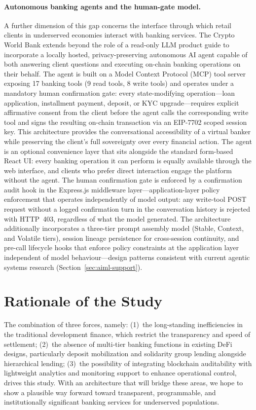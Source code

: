 \documentclass[12pt,a4paper]{report}
\begin{document}
\paragraph{Autonomous banking agents and the human-gate model.}
A further dimension of this gap concerns the interface through which retail clients in underserved economies interact with banking services. The Crypto World Bank extends beyond the role of a read-only LLM product guide to incorporate a locally hosted, privacy-preserving autonomous AI agent capable of both answering client questions and executing on-chain banking operations on their behalf. The agent is built on a Model Context Protocol (MCP) tool server exposing 17 banking tools (9 read tools, 8 write tools) and operates under a mandatory human confirmation gate: every state-modifying operation---loan application, installment payment, deposit, or KYC upgrade---requires explicit affirmative consent from the client before the agent calls the corresponding write tool and signs the resulting on-chain transaction via an EIP-7702 scoped session key. This architecture provides the conversational accessibility of a virtual banker while preserving the client's full sovereignty over every financial action. The agent is an optional convenience layer that sits alongside the standard form-based React UI: every banking operation it can perform is equally available through the web interface, and clients who prefer direct interaction engage the platform without the agent. The human confirmation gate is enforced by a confirmation audit hook in the Express.js middleware layer---application-layer policy enforcement that operates independently of model output: any write-tool POST request without a logged confirmation turn in the conversation history is rejected with HTTP~403, regardless of what the model generated. The architecture additionally incorporates a three-tier prompt assembly model (Stable, Context, and Volatile tiers), session lineage persistence for cross-session continuity, and pre-call lifecycle hooks that enforce policy constraints at the application layer independent of model behaviour---design patterns consistent with current agentic systems research (Section~\ref{sec:aiml-support}).

\section{Rationale of the Study}

The combination of three forces, namely: (1)~the long-standing inefficiencies in the traditional development finance, which restrict the transparency and speed of settlement; (2)~the absence of multi-tier banking functions in existing DeFi designs, particularly deposit mobilization and solidarity group lending alongside hierarchical lending; (3)~the possibility of integrating blockchain auditability with lightweight analytics and monitoring support to enhance operational control, drives this study. With an architecture that will bridge these areas, we hope to show a plausible way forward toward transparent, programmable, and institutionally significant banking services for underserved populations.
\end{document}

